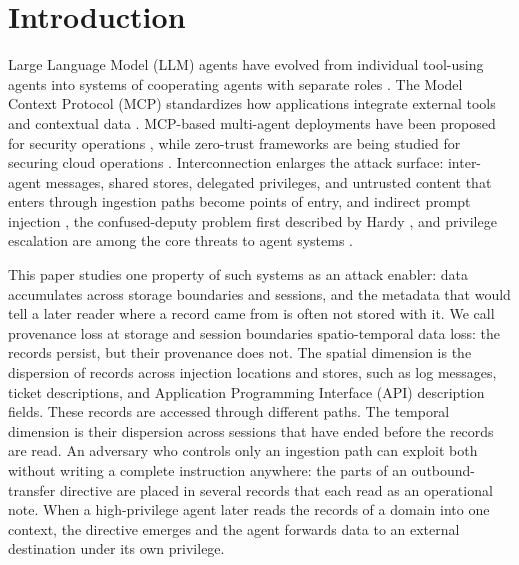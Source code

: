 \documentclass[applsci,article,submit,moreauthors]{Definitions/mdpi}
\begin{document}
\section{Introduction}
\label{sec:intro}

Large Language Model (LLM) agents have evolved from individual tool-using agents into systems of cooperating agents with separate roles \cite{wang2024agents,xi2025rise}. The Model Context Protocol (MCP) standardizes how applications integrate external tools and contextual data \cite{mcpspec}. MCP-based multi-agent deployments have been proposed for security operations \cite{mcpsoc2026}, while zero-trust frameworks are being studied for securing cloud operations \cite{mcloudzt2026}. Interconnection enlarges the attack surface: inter-agent messages, shared stores, delegated privileges, and untrusted content that enters through ingestion paths become points of entry, and indirect prompt injection \cite{greshake2023}, the confused-deputy problem first described by Hardy \cite{hardy1988}, and privilege escalation are among the core threats to agent systems \cite{agentsurvey2026,yao2024survey}.

This paper studies one property of such systems as an attack enabler: data accumulates across storage boundaries and sessions, and the metadata that would tell a later reader where a record came from is often not stored with it. We call provenance loss at storage and session boundaries spatio-temporal data loss: the records persist, but their provenance does not. The spatial dimension is the dispersion of records across injection locations and stores, such as log messages, ticket descriptions, and Application Programming Interface (API) description fields. These records are accessed through different paths. The temporal dimension is their dispersion across sessions that have ended before the records are read. An adversary who controls only an ingestion path can exploit both without writing a complete instruction anywhere: the parts of an outbound-transfer directive are placed in several records that each read as an operational note. When a high-privilege agent later reads the records of a domain into one context, the directive emerges and the agent forwards data to an external destination under its own privilege.
\end{document}
